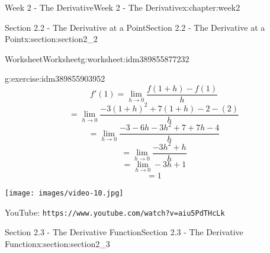 \documentclass[oneside,10pt,]{book}
\newcommand{\mono}[1]{\texttt{#1}}
\numberwithin{equation}{section}
\newlength{\qrsize}
\newlength{\previewwidth}
\begin{document}
\begin{chapterptx}{Week 2 - The Derivative}{}{Week 2 - The Derivative}{}{}{x:chapter:week2}
\begin{sectionptx}{Section 2.2 - The Derivative at a Point}{}{Section 2.2 - The Derivative at a Point}{}{}{x:section:section2_2}
\begin{worksheet-subsection}{Worksheet}{}{Worksheet}{}{}{g:worksheet:idm389855877232}
\begin{divisionexercise}{3}{}{}{g:exercise:idm389855903952}
\begin{equation*}
f'(1) = \lim_{h\to 0} \frac{f(1+h)-f(1)}{h} 
\end{equation*}
%
\begin{equation*}
= \lim_{h\to 0} \frac{-3(1+h)^2+7(1+h)-2-(2)}{h}
\end{equation*}
%
\begin{equation*}
= \lim_{h\to 0} \frac{-3-6h-3h^2+7+7h-4}{h}
\end{equation*}
%
\begin{equation*}
= \lim_{h\to 0} \frac{-3h^2+h}{h} 
\end{equation*}
%
\begin{equation*}
= \lim_{h\to 0} -3h+1
\end{equation*}
%
\begin{equation*}
= 1 
\end{equation*}
\end{divisionexercise}%
\end{worksheet-subsection}
\restoregeometry
\setlength{\qrsize}{9em}
\setlength{\previewwidth}{\linewidth}
\addtolength{\previewwidth}{-\qrsize}
\begin{tcbraster}[raster columns=2, raster column skip=1pt, raster halign=center, raster force size=false, raster left skip=0pt, raster right skip=0pt]%
\begin{tcolorbox}[previewstyle, width=\previewwidth]%
\texttt{[image: images/video-10.jpg]}%
\end{tcolorbox}%
\begin{tcolorbox}[qrstyle]%
{\hypersetup{urlcolor=black}}%
\end{tcolorbox}%
\begin{tcolorbox}[captionstyle]%
\small YouTube: \mono{https://www.youtube.com/watch?v=aiu5PdTHcLk}\end{tcolorbox}%
\end{tcbraster}%
\end{sectionptx}
%
%
\typeout{************************************************}
\typeout{************************************************}
%
\begin{sectionptx}{Section 2.3 - The Derivative Function}{}{Section 2.3 - The Derivative Function}{}{}{x:section:section2_3}
\setlength{\qrsize}{9em}
\setlength{\previewwidth}{\linewidth}
\addtolength{\previewwidth}{-\qrsize}
\begin{tcbraster}[raster columns=2, raster column skip=1pt, raster halign=center, raster force size=false, raster left skip=0pt, raster right skip=0pt]%

\end{tcbraster}
\end{sectionptx}
\end{chapterptx}
\end{document}
